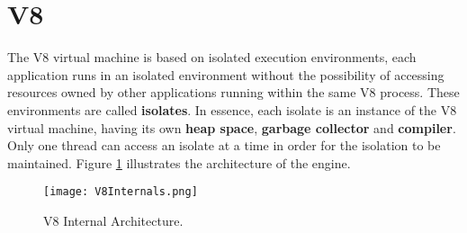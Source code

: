\documentclass{l4proj}
\begin{document}
\section{V8}
\hspace*{1em} The V8 virtual machine is based on isolated execution environments, each application runs in an isolated environment without the possibility of accessing resources owned by other applications running within the same V8 process. These environments are called \textbf{isolates}. In essence, each isolate is an instance of the V8 virtual machine, having its own \textbf{heap space}, \textbf{garbage collector} and \textbf{compiler}. Only one thread can access an isolate at a time in order for the isolation to be maintained. Figure \ref{v8arch} illustrates the architecture of the engine.

\begin{figure}[!ht]
  \centering
    \texttt{[image: V8Internals.png]}
  \caption{V8 Internal Architecture.}
    \label{v8arch}
\end{figure}
\end{document}
